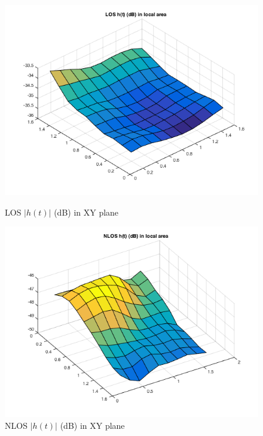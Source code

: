 \documentclass[a4paper]{article}
\begin{document}
    \begin{figure}[h]
		\begin{minipage}[t]{0.5\linewidth}
			\centering
			\includegraphics[scale=0.4]{figures/LOS_ht_LA.png}
            \vspace{-0.2cm}
            \centering
            \caption{LOS $|h(t)|$ (dB) in XY plane}
            \label{fig:ht_LOS}
		\end{minipage}
		\begin{minipage}[t]{0.5\linewidth}
			\centering
			\includegraphics[scale=0.4]{figures/NLOS_ht_LA.png}
            \vspace{-0.2cm}
            \centering
            \caption{NLOS $|h(t)|$ (dB) in XY plane}
            \label{fig:ht_NLOS}
		\end{minipage}
	\end{figure}
    
\end{document}
